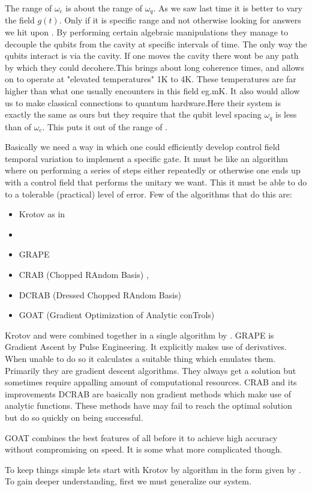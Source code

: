 The range of $\omega_{c}$ is about the range of $\omega_{q}$.  As we saw last time it is better to vary the field $g(t)$. Only if it is specific range and not otherwise looking for answers we hit upon \cite{hot_gates}. By performing certain algebraic manipulations they manage to decouple the qubits from the cavity at specific intervals of time. The only way the qubits interact is via the cavity. If one moves the cavity there wont be any path by which they could decohere.This brings about long coherence times, and allows on to operate at "elevated temperatures" 1K to 4K. These temperatures are far higher than what one usually encounters in this field eg.mK. It also would allow us to make classical connections to quantum hardware.Here their system is exactly the same as ours but they require that the qubit level spacing $\omega_{q}$ is less than of $\omega_{c}$. This puts it out of the range of \cite{petta}.
\par
Basically we need a way in which one could efficiently develop control field temporal variation to implement a specific gate.  It must be like an algorithm where on performing a series of steps either repeatedly or otherwise one ends up with a control field that performs the unitary we want. This it must be able to do to a tolerable (practical) level of error. Few of the algorithms that do this are:
\begin{itemize}
    \item Krotov as in \cite{tannor1992control}
    \item \cite{zhu1998rapid}
    \item GRAPE  \cite{khaneja2005optimal}
    \item CRAB (Chopped RAndom Basis) \cite{doria}, \cite{caneva2011chopped}
    \item DCRAB (Dressed Chopped RAndom Basis) \cite{rach2015dressing}
    \item GOAT (Gradient Optimization of Analytic conTrols) \cite{machnes2015gradient}
\end{itemize}
\par
Krotov \citep{tannor1992control} and \citep{zhu1998rapid} were combined together in a single algorithm by \citep{maday2003new}.   GRAPE \citep{khaneja2005optimal} is Gradient Ascent by Pulse Engineering. It explicitly makes use of derivatives. When unable to do so it calculates a suitable thing which emulates them. Primarily they are gradient descent algorithms. They always get a solution but sometimes require appalling amount of computational resources. CRAB and its improvements DCRAB \citep{rach2015dressing} are basically non gradient methods which make use of analytic functions. These methods have may fail to reach the optimal solution but do so quickly on being successful.
\par
GOAT  \citep{machnes2015gradient} combines the best features of all before it to achieve high accuracy without compromising on speed. It is some what more complicated though.
\par
To keep things simple lets start with Krotov by \citep{tannor1992control} algorithm in the form given by  \citep{maday2003new}. To gain deeper understanding, first we must generalize our system. %

